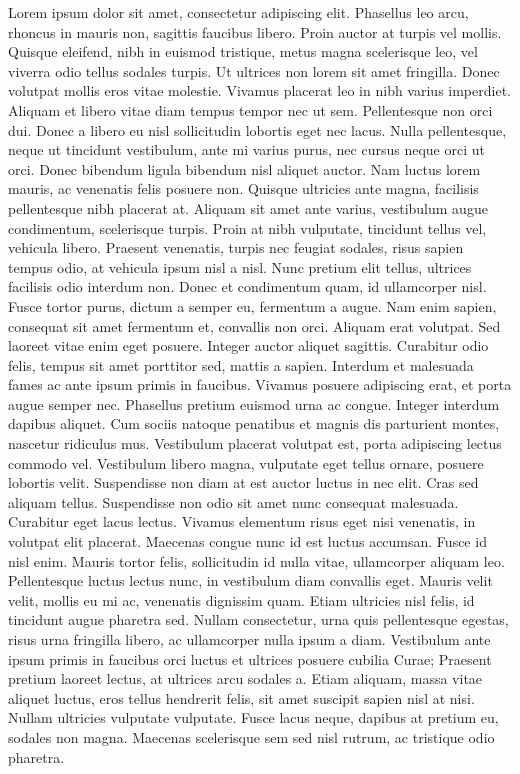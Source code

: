 \documentclass{article}
\begin{document}
\beginnumbering

\pstart
Lorem ipsum dolor sit amet, consectetur adipiscing elit. Phasellus leo arcu, rhoncus in mauris non, sagittis faucibus libero. Proin auctor at turpis vel mollis. Quisque eleifend, nibh in euismod tristique, metus magna scelerisque leo, vel viverra odio tellus sodales turpis. Ut ultrices non lorem sit amet fringilla. Donec volutpat mollis eros vitae molestie. Vivamus placerat leo in nibh varius imperdiet. Aliquam et libero vitae diam tempus tempor nec ut sem.
\pend
\pstart
Pellentesque non orci dui. Donec a libero eu nisl sollicitudin lobortis eget nec lacus. Nulla pellentesque, neque ut tincidunt vestibulum, ante mi varius purus, nec cursus neque orci ut orci. Donec bibendum ligula bibendum nisl aliquet auctor. Nam luctus lorem mauris, ac venenatis felis posuere non. Quisque ultricies ante magna, facilisis pellentesque nibh placerat at. Aliquam sit amet ante varius, vestibulum augue condimentum, scelerisque turpis. Proin at nibh vulputate, tincidunt tellus vel, vehicula libero. Praesent venenatis, turpis nec feugiat sodales, risus sapien tempus odio, at vehicula ipsum nisl a nisl. Nunc pretium elit tellus, ultrices facilisis odio interdum non. Donec et condimentum quam, id ullamcorper nisl.
\pend
\pstart
Fusce tortor purus, dictum a semper eu, fermentum a augue. Nam enim sapien, consequat sit amet fermentum et, convallis non orci. Aliquam erat volutpat. Sed laoreet vitae enim eget posuere. Integer auctor aliquet sagittis. Curabitur odio felis, tempus sit amet porttitor sed, mattis a sapien. Interdum et malesuada fames ac ante ipsum primis in faucibus. Vivamus posuere adipiscing erat, et porta augue semper nec.
\pend
\pstart
Phasellus pretium euismod urna ac congue. Integer interdum dapibus aliquet. Cum sociis natoque penatibus et magnis dis parturient montes, nascetur ridiculus mus. Vestibulum placerat volutpat est, porta adipiscing lectus commodo vel. Vestibulum libero magna, vulputate eget tellus ornare, posuere lobortis velit. Suspendisse non diam at est auctor luctus in nec elit. Cras sed aliquam tellus. Suspendisse non odio sit amet nunc consequat malesuada. Curabitur eget lacus lectus. Vivamus elementum risus eget nisi venenatis, in volutpat elit placerat. Maecenas congue nunc id est luctus accumsan. Fusce id nisl enim.
\pend
\pstart
Mauris tortor felis, sollicitudin id nulla vitae, ullamcorper aliquam leo. Pellentesque luctus lectus nunc, in vestibulum diam convallis eget. Mauris velit velit, mollis eu mi ac, venenatis dignissim quam. Etiam ultricies nisl felis, id tincidunt augue pharetra sed. Nullam consectetur, urna quis pellentesque egestas, risus urna fringilla libero, ac ullamcorper nulla ipsum a diam. Vestibulum ante ipsum primis in faucibus orci luctus et ultrices posuere cubilia Curae; Praesent pretium laoreet lectus, at ultrices arcu sodales a. Etiam aliquam, massa vitae aliquet luctus, eros tellus hendrerit felis, sit amet suscipit sapien nisl at nisi. Nullam ultricies vulputate vulputate. Fusce lacus neque, dapibus at pretium eu, sodales non magna. Maecenas scelerisque sem sed nisl rutrum, ac tristique odio pharetra.
\pend
\endnumbering
\printindex[issue115]
\end{document}
